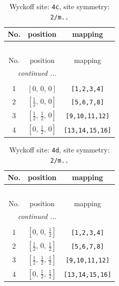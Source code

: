\documentclass[fleqn,8pt]{jsarticle}
\begin{document}
\renewcommand{\arraystretch}{1.2}
\begin{longtable}{ccc}
\caption{Wyckoff site: {\tt 4c}, site symmetry: {\tt 2/m..}}
 \\
 \hline \hline
No. & position & mapping \\ \hline \endfirsthead

\multicolumn{2}{l}{\tablename\ \thetable{}} \\
 \hline \hline
No. & position & mapping \\ \hline \endhead

 \hline \hline
\multicolumn{2}{r}{\footnotesize\it continued ...} \\ \endfoot

 \hline \hline
\multicolumn{2}{r}{} \\ \endlastfoot

1 & $\left[ 0,\, 0,\, 0 \right]$ & {\tt [1,2,3,4]} \\ \hline
2 & $\left[ \frac{1}{2},\, 0,\, 0 \right]$ & {\tt [5,6,7,8]} \\ \hline
3 & $\left[ \frac{1}{2},\, \frac{1}{2},\, 0 \right]$ & {\tt [9,10,11,12]} \\ \hline
4 & $\left[ 0,\, \frac{1}{2},\, 0 \right]$ & {\tt [13,14,15,16]} \\
\end{longtable}
\renewcommand{\arraystretch}{1.2}
\begin{longtable}{ccc}
\caption{Wyckoff site: {\tt 4d}, site symmetry: {\tt 2/m..}}
 \\
 \hline \hline
No. & position & mapping \\ \hline \endfirsthead

\multicolumn{2}{l}{\tablename\ \thetable{}} \\
 \hline \hline
No. & position & mapping \\ \hline \endhead

 \hline \hline
\multicolumn{2}{r}{\footnotesize\it continued ...} \\ \endfoot

 \hline \hline
\multicolumn{2}{r}{} \\ \endlastfoot

1 & $\left[ 0,\, 0,\, \frac{1}{2} \right]$ & {\tt [1,2,3,4]} \\ \hline
2 & $\left[ \frac{1}{2},\, 0,\, \frac{1}{2} \right]$ & {\tt [5,6,7,8]} \\ \hline
3 & $\left[ \frac{1}{2},\, \frac{1}{2},\, \frac{1}{2} \right]$ & {\tt [9,10,11,12]} \\ \hline
4 & $\left[ 0,\, \frac{1}{2},\, \frac{1}{2} \right]$ & {\tt [13,14,15,16]} \\
\end{longtable}
\end{document}
